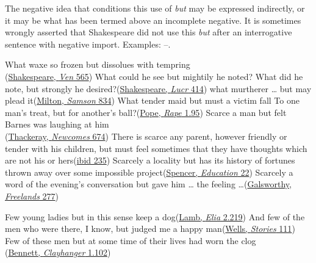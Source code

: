 The negative idea that conditions this use of \textit{but} may be expressed indirectly, or it may be what has been termed above an incomplete negative. It is sometimes wrongly asserted that Shakespeare did not use this \textit{but} after an interrogative sentence with negative import. Examples: --.

\ea \label{ex:12-18}
\ea
What waxe so frozen but dissolues with tempring\\\hfill(\href{https://internetshakespeare.uvic.ca/doc/Ven_Q1/stanza/91~95/index.html#tln-565}{Shakespeare, \textit{Ven} 565}) %
\ex
What could he see but mightily he noted? What did he note, but strongly he desired?\hfill(\href{https://internetshakespeare.uvic.ca/doc/Luc_Q1/stanza/56~60/index.html#tln-410}{Shakespeare, \textit{Lucr} 414})
\ex
what murtherer {\dots} but may plead it\hfill(\href{https://archive.org/details/poeticalworksofj00miltiala/page/528/mode/2up?ref=ol&view=theater&q=%22may+plead+it%22}{Milton, \textit{Samson} 834}) %
\ex
What tender maid but must a victim fall To one man's treat, but for another's ball?\hfill(\href{https://archive.org/details/bim_eighteenth-century_the-rape-of-the-lock-an_pope-alexander_1729/page/6/mode/2up?q=%22tender+maid+but+must+a+victim%22&view=theater}{Pope, \textit{Rape} 1.95})
\z
\z
\pagebreak
\ea \label{ex:12-18a}
\ea
Scarce a man but felt Barnes was laughing at him\\\hfill(\href{https://archive.org/details/memoirsonewcomes02thacrich/page/166/mode/2up?q=%22scarce+a+man%22&view=theater}{Thackeray, \textit{Newcomes} 674})
\ex
There is scarce any parent, however friendly or tender with his children, but must feel sometimes that they have thoughts which are not his or hers\hfill(\href{https://archive.org/details/newcomes00unkngoog/page/n234/mode/2up?q=%22scarce+any+parent%22&view=theater}{ibid 235}) %
\ex
Scarcely a locality but has its history of fortunes thrown away over some impossible project\hfill(\href{https://archive.org/details/educationintell02spengoog/page/n46/mode/2up?q=%22scarcely+a+locality%22&view=theater}{Spencer, \textit{Education} 22})
\ex
Scarcely a word of the evening's conversation but gave him {\dots} the feeling {\dots}\hfill(\href{https://archive.org/details/freelands00galsrich/page/240/mode/2up?q=%22scarcely+a+word%22&view=theater}{Galsworthy, \textit{Freelands} 277})
\z
\z

\ea \label{ex:12-18b}
\ea
Few young ladies but in this sense keep a dog\hfill(\href{https://archive.org/details/essayseliacharle00lamb/page/318/mode/2up?q=%22few+young+ladies+but%22&view=theater}{Lamb, \textit{Elia} 2.219})
\ex
And few of the men who were there, I know, but judged me a happy man\hfill(\href{https://archive.org/details/twelvestoriesand00well/page/344/mode/2up?q=%22few+of+the+men%22&view=theater}{Wells, \textit{Stories} 111}) %
\ex
Few of these men but at some time of their lives had worn the clog\\\hfill(\href{https://archive.org/details/clayhanger01benngoog/page/84/mode/2up?q=%22these+men+but%22&view=theater}{Bennett, \textit{Clayhanger} 1.102})
\z
\z
{}

